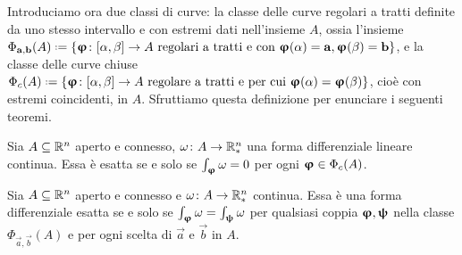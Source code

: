 Introduciamo ora due classi di curve: la classe delle curve regolari a tratti definite da uno stesso intervallo e con estremi dati nell'insieme $A$, ossia l'insieme $\Phi_{\vec a,\vec b}(A)\defeq\{\vphi\colon[\alpha,\beta]\to A\text{ regolari a tratti e con }\vphi(\alpha)=\vec a, \vphi(\beta)=\vec b\}$, e la classe delle curve chiuse $\Phi_c(A)\defeq\{\vphi\colon[\alpha,\beta]\to A\text{ regolare a tratti e per cui }\vphi(\alpha)=\vphi(\beta)\}$, cioè con estremi coincidenti, in $A$.
Sfruttiamo questa definizione per enunciare i seguenti teoremi.
\begin{teorema}
	Sia $A\subseteq\mathbb{R}^n$ aperto e connesso, $\omega\colon A\to\mathbb{R}^n_*$ una forma differenziale lineare continua.
	Essa è esatta se e solo se $\int_{\bm{\upvarphi}}\omega=0$ per ogni $\bm{\upvarphi}\in\Phi_c(A)$.
\end{teorema}
\begin{teorema}
	Sia $A\subseteq\mathbb{R}^n$ aperto e connesso e $\omega\colon A\to\mathbb{R}^n_*$ continua.
	Essa è una forma differenziale esatta se e solo se $\int_{\bm{\upvarphi}}\omega=\int_{\bm{\uppsi}}\omega$ per qualsiasi coppia $\bm{\upvarphi},\bm{\uppsi}$ nella classe $\Phi_{\vec a,\vec b}(A)$ e per ogni scelta di $\vec a$ e $\vec b$ in $A$.
\end{teorema}

